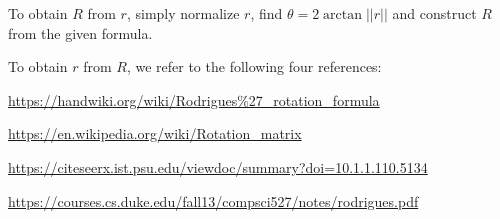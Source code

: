\documentclass{scrbook}
\begin{document}
To obtain $R$ from $r$, simply normalize $r$, find $\theta =2\arctan \left| \left| r\right| \right| $ and construct $R$ from the given formula.

To obtain $r$ from $R$, we refer to the following four references: 

\url{https://handwiki.org/wiki/Rodrigues\%27_rotation_formula}

\url{https://en.wikipedia.org/wiki/Rotation_matrix}

\url{https://citeseerx.ist.psu.edu/viewdoc/summary?doi=10.1.1.110.5134}

\url{https://courses.cs.duke.edu/fall13/compsci527/notes/rodrigues.pdf}
\end{document}
